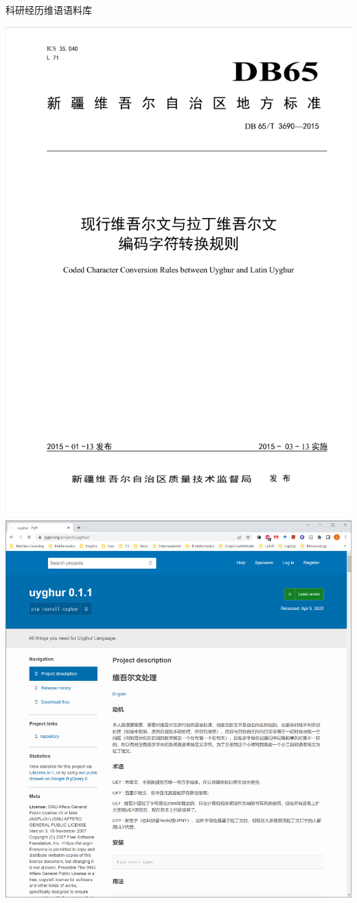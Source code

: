 \documentclass[xcolor=svgnames, t, aspectratio=169]{ctexbeamer}
\begin{document}
\begin{frame}{科研经历}{维语语料库}
  \begin{center}
    \includegraphics[scale=0.2]{db65t3690-2015.png}
    \includegraphics[scale=0.16]{uyghurpypi.png}
  \end{center}
\end{frame}
\end{document}
